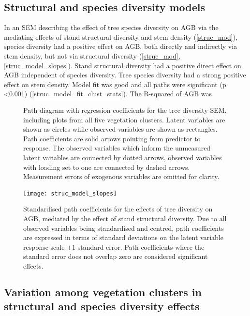 \documentclass[11pt,a4paper]{article}
\begin{document}
\subsection{Structural and species diversity models}

In an SEM describing the effect of tree species diversity on AGB via the mediating effects of stand structural diversity and stem density (\autoref{struc_mod}), species diversity had a positive effect on AGB, both directly and indirectly via stem density, but not via structural diversity (\autoref{struc_mod}, \autoref{struc_model_slopes}). Stand structural diversity had a positive direct effect on AGB independent of species diversity. Tree species diversity had a strong positive effect on stem density. Model fit was good and all paths were significant (p <0.001) (\autoref{struc_model_fit_clust_stats}). The R-squared of AGB was \strucrsq{}


\begin{figure}[H]
\centering
	
	\caption{Path diagram with regression coefficients for the tree diversity SEM, including plots from all five vegetation clusters. Latent variables are shown as circles while observed variables are shown as rectangles. Path coefficients are solid arrows pointing from predictor to response. The observed variables which inform the unmeasured latent variables are connected by dotted arrows, observed variables with loading set to one are connected by dashed arrows. Measurement errors of exogenous variables are omitted for clarity.}
	\label{struc_mod}
\end{figure}

\begin{figure}[H]
\centering
	\texttt{[image: struc\_model\_slopes]}
	\caption{Standardised path coefficients for the effects of tree diversity on AGB, mediated by the effect of stand structural diversity. Due to all observed variables being standardised and centred, path coefficients are expressed in terms of standard deviations on the latent variable response scale $\pm$1 standard error. Path coefficients where the standard error does not overlap zero are considered significant effects.}
	\label{struc_model_slopes}
\end{figure}

\subsection{Variation among vegetation clusters in structural and species diversity effects}
\end{document}
